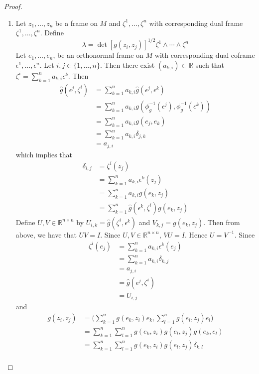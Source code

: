 \documentclass{book}
\theoremstyle{definition}
\newcommand{\del}{\delta}
\newcommand{\ep}{\epsilon}
\newcommand{\ze}{\zeta}
\newcommand{\lam}{\lambda}
\newcommand{\R}{\mathbb{R}}
\DeclareMathOperator*{\0}{\mbf{0}}
\DeclareMathOperator*{\1}{\mbf{1}}
\begin{document}
\begin{proof}\
	\begin{enumerate}
		\item Let $z_1, \ldots, z_n$ be a frame on $M$ and $\ze^1, \ldots, \ze^n$ with corresponding dual frame $\ze^1, \ldots, \ze^n$. Define 
		$$\lam = \det [g(z_i, z_j)]^{1/2} \ze^1 \wedge \cdots \wedge \ze^n$$
		Let $e_1, \ldots, e_n$, be an orthonormal frame on $M$ with corresponding dual coframe $\ep^1, \ldots, \ep^n$. Let $i,j \in \{1, \ldots, n\}$. Then there exist $(a_{k,i}) \subset \R$ such that $\ze^i = \sum\limits_{k=1}^n a_{k,i} \ep^k$.
		Then 
		\begin{align*}
			\hat{g}(\ep^j, \ze^i)
			& = \sum\limits_{k=1}^n a_{k,i} \hat{g}(\ep^j, \ep^k) \\
			& = \sum\limits_{k=1}^n a_{k,i} g( \phi_g^{-1}(\ep^j), \phi_g^{-1}(\ep^k)) \\
			& = \sum\limits_{k=1}^n a_{k,i} g(e_j, e_k) \\
			& = \sum\limits_{k=1}^n a_{k,i} \del_{j,k} \\
			& = a_{j,i}
		\end{align*}
		which implies that
		\begin{align*}
			\del_{i,j}
			& = \ze^i(z_j) \\
			& = \sum\limits_{k=1}^n a_{k,i} \ep^k(z_j) \\
			& = \sum\limits_{k=1}^n a_{k,i} g(e_k, z_j) \\
			& = \sum\limits_{k=1}^n \hat{g}(\ep^k, \ze^i) g(e_k, z_j) 
		\end{align*}
		Define $U, V \in \R^{n \times n}$ by $U_{i,k} = \hat{g}(\ze^i, \ep^k)$ and $V_{k,j} = g(e_k, z_j)$. Then from above, we have that $UV = I$. Since $U,V \in \R^{n \times n}$, $VU = I$. Hence $U = V^{-1}$. Since 
		\begin{align*}
			\ze^i(e_j)
			& = \sum_{k=1}^n a_{k,i}\ep^k(e_j) \\
			& = \sum_{k=1}^n a_{k,i} \del_{k, j} \\
			& = a_{j, i} \\
			& = \hat{g}(\ep^j, \ze^i) \\
			& = U_{i,j}
		\end{align*}
		and 
		\begin{align*}
			g(z_i, z_j)
			& = \bigg( \sum_{k=1}^n g(e_k, z_i)e_k , \sum_{l=1}^n g(e_l, z_j) e_l \bigg) \\
			& = \sum_{k=1}^n \sum_{l=1}^n g(e_k, z_i) g(e_l, z_j) g(e_k, e_l) \\
			& = \sum_{k=1}^n \sum_{l=1}^n g(e_k, z_i) g(e_l, z_j) \del_{k,l} \\

\end{align*}
\end{enumerate}
\end{proof}
\end{document}
